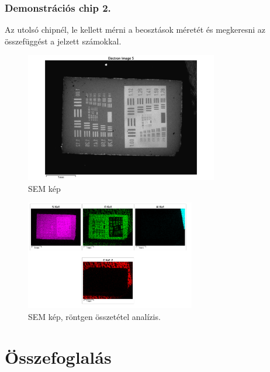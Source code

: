 \documentclass[a4paper,12pt]{article}
\begin{document}
\subsubsection{ Demonstrációs chip 2.}

\par Az utolsó chipnél, le kellett mérni a beosztások méretét és
megkeresni az összefüggést a jelzett számokkal.

\begin{figure}[H]
	\centering
	\includegraphics[width=0.75\textwidth]{./Jcsop/chip2.png}
	\caption{SEM kép}
\end{figure}

\begin{figure}[H]
	\centering
	\includegraphics[width=0.66\textwidth]{./Jcsop/chip2rtg.png}
	\caption{SEM kép, röntgen összetétel analízis.}
\end{figure}

\section{ Összefoglalás}
\end{document}
